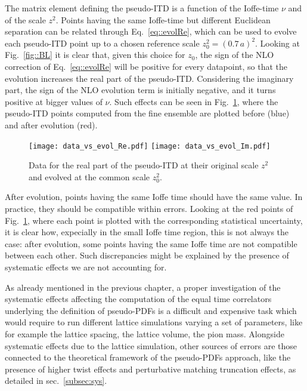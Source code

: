 The matrix element defining the pseudo-ITD is a function of the Ioffe-time $\nu$ and of the scale $z^2$.
Points having the same Ioffe-time but different Euclidean separation can be related through Eq.~\eqref{eq::evolRe}, 
which can be used to evolve each pseudo-ITD point up to a chosen reference scale $z_0 ^2 = \left(0.7\,a\right)^2$.
Looking at Fig.~\ref{fig::BL} it is clear that, given this choice for $z_0$, the sign of the NLO correction 
of Eq.~\eqref{eq::evolRe} will be positive for every datapoint, so that the evolution increases the real part of the pseudo-ITD.
Considering the imaginary part, the sign of the NLO evolution term is initially negative, and it turns positive at bigger values of $\nu$.
Such effects can be seen in Fig.~\ref{fig::evol}, where the pseudo-ITD points computed from the fine ensemble are plotted
before (blue) and after evolution (red). 
\begin{figure}[h!]
    \center
    \texttt{[image: data\_vs\_evol\_Re.pdf]}
    \texttt{[image: data\_vs\_evol\_Im.pdf]}
    \caption{Data for the real part of the pseudo-ITD at their original scale $z^2$ and evolved at the common scale $z_0^2$.}
    \label{fig::evol}
\end{figure}
After evolution, points having the same Ioffe time should have the same value.
In practice, they should be compatible within errors.
Looking at the red points of Fig.~\ref{fig::evol}, where each point is plotted with the corresponding statistical uncertainty, 
it is clear how, expecially in the small Ioffe time region, this is not always the case:
after evolution, some points having the same Ioffe time are not compatible between each other.
Such discrepancies might be explained by the presence of systematic effects we are not accounting for.

% 
As already mentioned in the previous chapter, a proper investigation of the systematic effects affecting
the computation of the equal time correlators underlying
the definition of pseudo-PDFs is a difficult and expensive task which would require to run different lattice simulations 
varying a set of parameters, like for example the lattice spacing, the lattice volume, the pion mass. 
Alongside systematic effects due to the lattice simulation, other sources of errors are those connected 
to the theoretical framework of the pseudo-PDFs approach, like the presence of higher twist effects 
and perturbative matching truncation effects, as detailed in sec.~\ref{subsec:sys}. 
 
